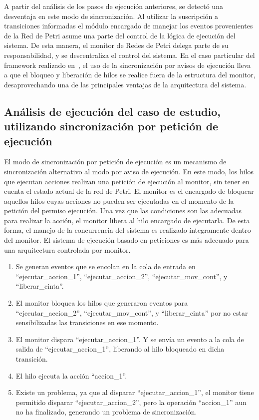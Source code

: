 A partir del análisis de los pasos de ejecución anteriores, se detectó una
desventaja en este modo de sincronización.
Al utilizar la suscripción a transiciones informadas el módulo
encargado de manejar los eventos provenientes de la Red de Petri asume
una parte del control de la lógica de ejecución del sistema.
De esta manera, el monitor de Redes de Petri delega parte de su
responsabilidad, y se descentraliza el control del sistema. En el caso
particular del framework realizado en~\cite{chimp}, el uso de la sincronización
por avisos de ejecución lleva a que el bloqueo y liberación de hilos se realice
fuera de la estructura del monitor, desaprovechando una de las principales
ventajas de la arquitectura del sistema.
\\

\subsection{Análisis de ejecución del caso de estudio, utilizando
sincronización por petición de ejecución}
\label{sec:sincronizacion_peticion_ejecucion}
 El modo de sincronización por petición de ejecución es un mecanismo de
 sincronización alternativo al modo por aviso de ejecución.
 En este modo, los hilos que ejecutan acciones realizan una petición de
 ejecución al monitor, sin tener en cuenta el estado actual de la red de Petri.
 El monitor es el encargado de bloquear aquellos hilos cuyas acciones no
 pueden ser ejecutadas en el momento de la petición del permiso ejecución. Una
 vez que las condiciones son las adecuadas para realizar la acción, el monitor
 libera al hilo encargado de ejecutarla.
 De esta forma, el manejo de la concurrencia del sistema es realizado
 íntegramente dentro del monitor. El sistema de ejecución basado en
 peticiones es más adecuado para una arquitectura controlada por monitor. 

\begin{enumerate}
    \item Se generan eventos que se encolan en la cola de entrada en
    ``ejecutar\_accion\_1'', ``ejecutar\_accion\_2'', ``ejecutar\_mov\_cont'', y
    ``liberar\_cinta''.
    \item El monitor bloquea los hilos que generaron eventos para
    ``ejecutar\_accion\_2'', ``ejecutar\_mov\_cont'', y ``liberar\_cinta'' por no
    estar sensibilizadas las transiciones en ese momento.
    \item El monitor dispara “ejecutar\_accion\_1”. Y se envía un evento a la
    cola de salida de “ejecutar\_accion\_1”, liberando al hilo bloqueado en
    dicha transición.
    \item El hilo ejecuta la acción “accion\_1”.
    \item Existe un problema, ya que al disparar “ejecutar\_accion\_1”, el
    monitor tiene permitido disparar “ejecutar\_accion\_2”, pero la operación
    “accion\_1” aun no ha finalizado, generando un problema de sincronización.
\end{enumerate}

